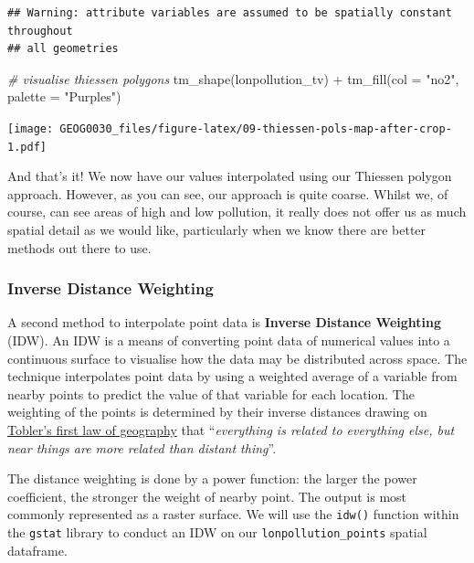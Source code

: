 \documentclass[
]{book}
\newenvironment{Shaded}{\begin{snugshade}}{\end{snugshade}}
\newcommand{\AttributeTok}[1]{\textcolor[rgb]{0.77,0.63,0.00}{#1}}
\newcommand{\CommentTok}[1]{\textcolor[rgb]{0.56,0.35,0.01}{\textit{#1}}}
\newcommand{\FunctionTok}[1]{\textcolor[rgb]{0.00,0.00,0.00}{#1}}
\newcommand{\NormalTok}[1]{#1}
\newcommand{\SpecialCharTok}[1]{\textcolor[rgb]{0.00,0.00,0.00}{#1}}
\newcommand{\StringTok}[1]{\textcolor[rgb]{0.31,0.60,0.02}{#1}}
\begin{document}
\begin{verbatim}
## Warning: attribute variables are assumed to be spatially constant throughout
## all geometries
\end{verbatim}

\begin{Shaded}
\begin{Highlighting}[]
\CommentTok{\# visualise thiessen polygons}
\FunctionTok{tm\_shape}\NormalTok{(lonpollution\_tv) }\SpecialCharTok{+}
  \FunctionTok{tm\_fill}\NormalTok{(}\AttributeTok{col =} \StringTok{"no2"}\NormalTok{, }\AttributeTok{palette =} \StringTok{"Purples"}\NormalTok{)}
\end{Highlighting}
\end{Shaded}

\texttt{[image: GEOG0030\_files/figure-latex/09-thiessen-pols-map-after-crop-1.pdf]}

And that's it! We now have our values interpolated using our Thiessen polygon approach. However, as you can see, our approach is quite coarse. Whilst we, of course, can see areas of high and low pollution, it really does not offer us as much spatial detail as we would like, particularly when we know there are better methods out there to use.

\hypertarget{inverse-distance-weighting}{%
\subsubsection{Inverse Distance Weighting}\label{inverse-distance-weighting}}

A second method to interpolate point data is \textbf{Inverse Distance Weighting} (IDW). An IDW is a means of converting point data of numerical values into a continuous surface to visualise how the data may be distributed across space. The technique interpolates point data by using a weighted average of a variable from nearby points to predict the value of that variable for each location. The weighting of the points is determined by their inverse distances drawing on \href{https://en.wikipedia.org/wiki/Tobler\%27s_first_law_of_geography\#:~:text=The\%20First\%20Law\%20of\%20Geography,specifically\%20for\%20the\%20inverse\%20distance}{Tobler's first law of geography} that ``\emph{everything is related to everything else, but near things are more related than distant thing}''.

The distance weighting is done by a power function: the larger the power coefficient, the stronger the weight of nearby point. The output is most commonly represented as a raster surface. We will use the \texttt{idw()} function within the \texttt{gstat} library to conduct an IDW on our \texttt{lonpollution\_points} spatial dataframe.
\end{document}
